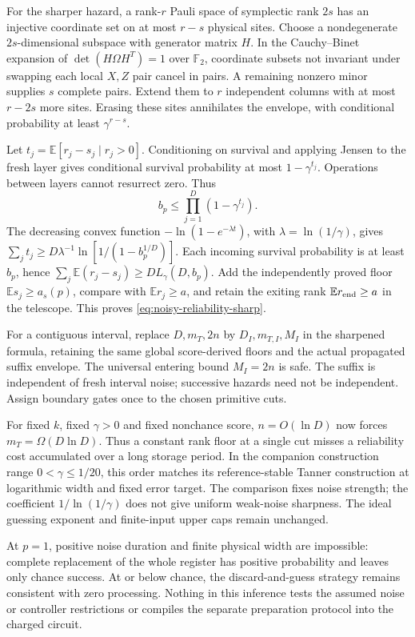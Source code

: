 \documentclass[11pt,a4paper]{article}
\newcommand{\E}{\mathbb E}
\begin{document}
For the sharper hazard, a rank-$r$ Pauli space of symplectic rank $2s$ has an injective coordinate set on at most $r-s$ physical sites. Choose a nondegenerate $2s$-dimensional subspace with generator matrix $H$. In the Cauchy--Binet expansion of $\det(H\Omega H^T)=1$ over $\mathbb F_2$, coordinate subsets not invariant under swapping each local $X,Z$ pair cancel in pairs. A remaining nonzero minor supplies $s$ complete pairs. Extend them to $r$ independent columns with at most $r-2s$ more sites. Erasing these sites annihilates the envelope, with conditional probability at least $\gamma^{r-s}$.

Let $t_j=\E[r_j-s_j\mid r_j>0]$. Conditioning on survival and applying Jensen to the fresh layer gives conditional survival probability at most $1-\gamma^{t_j}$. Operations between layers cannot resurrect zero. Thus
\[
b_p\le\prod_{j=1}^D(1-\gamma^{t_j}).
\]
The decreasing convex function $-\ln(1-e^{-\lambda t})$, with $\lambda=\ln(1/\gamma)$, gives
$\sum_jt_j\ge D\lambda^{-1}\ln[1/(1-b_p^{1/D})]$.
Each incoming survival probability is at least $b_p$, hence
$\sum_j\E(r_j-s_j)\ge D L_\gamma(D,b_p)$.
Add the independently proved floor $\E s_j\ge a_s(p)$, compare with $\E r_j\ge a$, and retain the exiting rank $\E r_{\rm end}\ge a$ in the telescope. This proves \eqref{eq:noisy-reliability-sharp}.

For a contiguous interval, replace $D,m_T,2n$ by $D_I,m_{T,I},M_I$ in the sharpened formula, retaining the same global score-derived floors and the actual propagated suffix envelope. The universal entering bound $M_I=2n$ is safe. The suffix is independent of fresh interval noise; successive hazards need not be independent. Assign boundary gates once to the chosen primitive cuts.

For fixed $k$, fixed $\gamma>0$ and fixed nonchance score, $n=O(\ln D)$ now forces $m_T=\Omega(D\ln D)$. Thus a constant rank floor at a single cut misses a reliability cost accumulated over a long storage period. In the companion construction range $0<\gamma\le1/20$, this order matches its reference-stable Tanner construction at logarithmic width and fixed error target. The comparison fixes noise strength; the coefficient $1/\ln(1/\gamma)$ does not give uniform weak-noise sharpness. The ideal guessing exponent and finite-input upper caps remain unchanged.

At $p=1$, positive noise duration and finite physical width are impossible: complete replacement of the whole register has positive probability and leaves only chance success. At or below chance, the discard-and-guess strategy remains consistent with zero processing. Nothing in this inference tests the assumed noise or controller restrictions or compiles the separate preparation protocol into the charged circuit.
\end{document}
